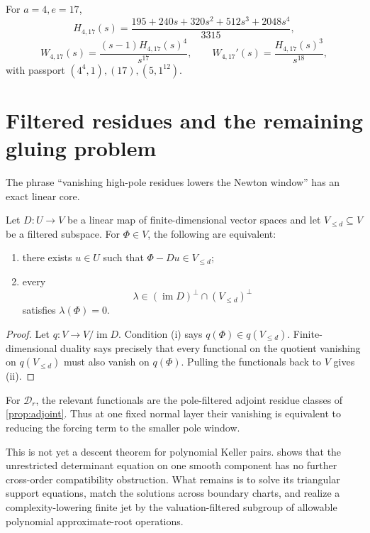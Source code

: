 \documentclass[11pt,reqno]{amsart}
\begin{document}
\begin{corollary}
\label{cor:417}
For \(a=4,e=17\),
\[
H_{4,17}(s)
=\frac{195+240s+320s^2+512s^3+2048s^4}{3315},
\]
\[
W_{4,17}(s)=\frac{(s-1)H_{4,17}(s)^4}{s^{17}},
\qquad
W_{4,17}'(s)=\frac{H_{4,17}(s)^3}{s^{18}},
\]
with passport \((4^4,1),(17),(5,1^{12})\).
\end{corollary}

\section{Filtered residues and the remaining gluing problem}
\label{sec:descent}

The phrase ``vanishing high-pole residues lowers the Newton window'' has an
exact linear core.

\begin{lemma}
\label{lem:filtered}
Let \(D:U\to V\) be a linear map of finite-dimensional vector spaces and
let \(V_{\le d}\subseteq V\) be a filtered subspace.  For
\(\Phi\in V\), the following are equivalent:
\begin{enumerate}[label=(\roman*)]
\item there exists \(u\in U\) such that
\(\Phi-Du\in V_{\le d}\);
\item every
\[
\lambda\in(\operatorname{im}D)^\perp
\cap(V_{\le d})^\perp
\]
satisfies \(\lambda(\Phi)=0\).
\end{enumerate}
\end{lemma}

\begin{proof}
Let \(q:V\to V/\operatorname{im}D\).  Condition (i) says
\(q(\Phi)\in q(V_{\le d})\).  Finite-dimensional duality says precisely
that every functional on the quotient vanishing on \(q(V_{\le d})\) must
also vanish on \(q(\Phi)\).  Pulling the functionals back to \(V\) gives
(ii).
\end{proof}

For \(\mathscr D_r\), the relevant functionals are the pole-filtered
adjoint residue classes of \cref{prop:adjoint}.  Thus at one fixed normal
layer their vanishing is equivalent to reducing the forcing term to the
smaller pole window.

This is not yet a descent theorem for polynomial Keller pairs.
 shows that the unrestricted
determinant equation on one smooth component has no further cross-order
compatibility obstruction.  What remains is to solve its triangular
support equations, match the solutions across boundary charts, and realize
a complexity-lowering finite jet by the valuation-filtered subgroup of
allowable polynomial approximate-root operations.
\end{document}
